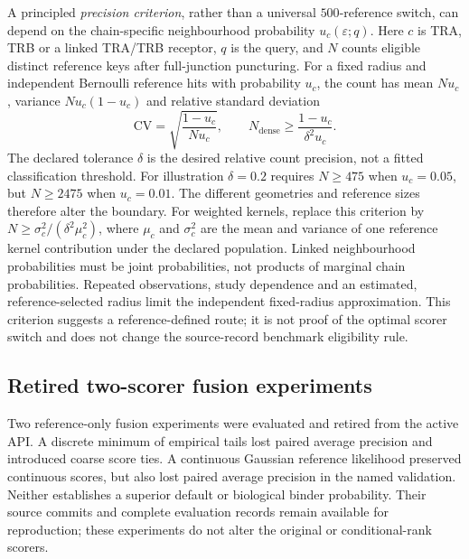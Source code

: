 \documentclass[10pt,a4paper]{article}
\theoremstyle{definition}
\begin{document}
A principled \emph{precision criterion}, rather than a universal $500$-reference switch,
can depend on the chain-specific neighbourhood probability $u_c(\varepsilon;q)$.
Here $c$ is TRA, TRB or a linked TRA/TRB receptor, $q$ is the query, and $N$ counts
eligible distinct reference keys after full-junction puncturing. For a fixed radius
and independent Bernoulli reference hits with probability $u_c$, the count has mean
$Nu_c$, variance $Nu_c(1-u_c)$ and relative standard deviation
\[
 \mathrm{CV}=\sqrt{\frac{1-u_c}{Nu_c}},\qquad
 N_{\mathrm{dense}}\ge\frac{1-u_c}{\delta^2u_c}.
\]
The declared tolerance $\delta$ is the desired relative count precision, not a fitted
classification threshold. For illustration $\delta=0.2$ requires $N\ge475$ when
$u_c=0.05$, but $N\ge2475$ when $u_c=0.01$. The different geometries and reference
sizes therefore alter the boundary. For weighted kernels, replace this criterion by
$N\ge\sigma_c^2/(\delta^2\mu_c^2)$, where $\mu_c$ and $\sigma_c^2$ are the mean and
variance of one reference kernel contribution under the declared population.
Linked neighbourhood probabilities must be joint probabilities, not products of
marginal chain probabilities. Repeated observations, study dependence and an estimated,
reference-selected radius limit the independent fixed-radius approximation.
This criterion suggests a reference-defined route; it is not proof of the optimal
scorer switch and does not change the source-record benchmark eligibility rule.

\subsection*{Retired two-scorer fusion experiments}
Two reference-only fusion experiments were evaluated and retired from the active API.
A discrete minimum of empirical tails lost paired average precision and introduced
coarse score ties. A continuous Gaussian reference likelihood preserved continuous
scores, but also lost paired average precision in the named validation.
Neither establishes a superior default or biological binder probability.
Their source commits and complete evaluation records remain available for reproduction;
these experiments do not alter the original or conditional-rank scorers.
\end{document}
